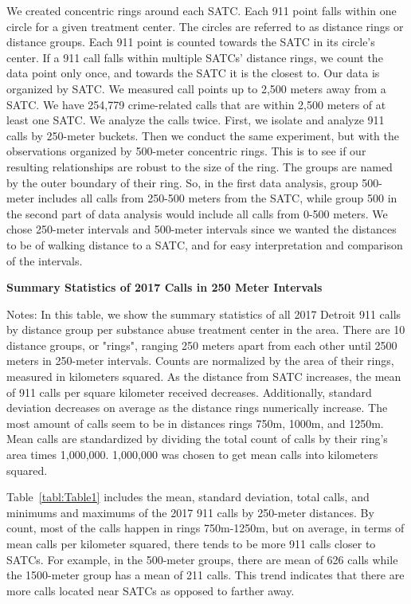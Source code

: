 \documentclass[12pt]{article}
\begin{document}
We created concentric rings around each SATC. Each 911 point falls within one circle for a given treatment center.  The circles are referred to as distance rings or distance groups. Each 911 point is counted towards the SATC in its circle's center. If a 911 call falls within multiple SATCs' distance rings, we count the data point only once, and towards the SATC it is the closest to. Our data is organized by SATC. We measured call points up to 2,500 meters away from a SATC. We have 254,779 crime-related calls that are within 2,500 meters of at least one SATC. We analyze the calls twice. First, we isolate and analyze 911 calls by 250-meter buckets. Then we conduct the same experiment, but with the observations organized by 500-meter concentric rings. This is to see if our resulting relationships are robust to the size of the ring. The groups are named by the outer boundary of their ring. So, in the first data analysis, group 500-meter includes all calls from 250-500 meters from the SATC, while group 500 in the second part of data analysis would include all calls from 0-500 meters. We chose 250-meter intervals and 500-meter intervals since we wanted the distances to be of walking distance to a SATC, and for easy interpretation and comparison of the intervals. 
\begin{table}[H]
\centering
\scalebox{0.8}{
\centering

}
\caption{\textbf{Summary Statistics of 2017 Calls in 250 Meter Intervals}}
\label{tabl:Table1}
\centering\footnotesize{Notes: In this table, we show the summary statistics of all 2017 Detroit 911 calls by distance group per substance abuse treatment center in the area. There are 10 distance groups, or "rings", ranging 250 meters apart from each other until 2500 meters in 250-meter intervals. Counts are normalized by the area of their rings, measured in kilometers squared. As the distance from SATC increases, the mean of 911 calls per square kilometer received decreases. Additionally, standard deviation decreases on average as the distance rings numerically increase. The most amount of calls seem to be in distances rings 750m, 1000m, and 1250m. Mean calls are standardized by dividing the total count of calls by their ring's area times 1,000,000. 1,000,000 was chosen to get mean calls into kilometers squared.}
\end{table}  

Table~\ref{tabl:Table1} includes the mean, standard deviation, total calls, and minimums and maximums of the 2017 911 calls by 250-meter distances. By count, most of the calls happen in rings 750m-1250m, but on average, in terms of mean calls per kilometer squared, there tends to be more 911 calls closer to SATCs. For example, in the 500-meter groups, there are mean of 626 calls while the 1500-meter group has a mean of 211 calls. This trend indicates that there are more calls located near SATCs as opposed to farther away. 
\end{document}
